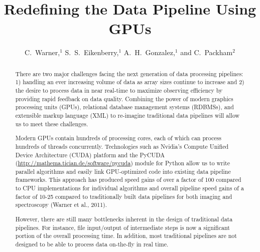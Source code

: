 
\resetcounters




\title{Redefining the Data Pipeline Using GPUs}
\author{C.~Warner,$^1$ S.~S.~Eikenberry,$^1$ A.~H.~Gonzalez,$^1$ and C.~Packham$^2$
}


\begin{abstract}
There are two major challenges facing the next generation of data processing pipelines: 1) handling an ever increasing volume of data as array sizes continue to increase and 2) the desire to process data in near real-time to maximize observing efficiency by providing rapid feedback on data quality.  Combining the power of modern graphics processing units (GPUs), relational database management systems (RDBMSs), and extensible markup language (XML) to re-imagine traditional data pipelines will allow us to meet these challenges.

Modern GPUs contain hundreds of processing cores, each of which can process hundreds of threads concurrently.  Technologies such as Nvidia's Compute Unified Device Architecture (CUDA) platform and the PyCUDA (\url{http://mathema.tician.de/software/pycuda}) module for Python allow us to write parallel algorithms and easily link GPU-optimized code into existing data pipeline frameworks.  This approach has produced speed gains of over a factor of 100 compared to CPU implementations for individual algorithms and overall pipeline speed gains of a factor of 10-25 compared to traditionally built data pipelines for both imaging and spectroscopy (Warner et al., 2011).

However, there are still many bottlenecks inherent in the design of traditional data pipelines.  For instance, file input/output of intermediate steps is now a significant portion of the overall processing time.  In addition, most traditional pipelines are not designed to be able to process data on-the-fly in real time.


\end{abstract}

